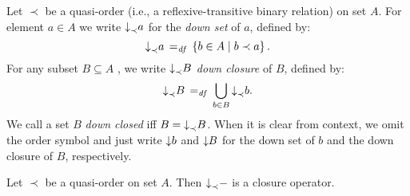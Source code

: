 \documentclass[11pt]{report}
\begin{document}
Let $\prec$ be a quasi-order (i.e., a reflexive-transitive binary
relation) on set $A$. For element $a \in A$ we write
$\operatorname{\downarrow}_{\prec}\!a$ for the \emph{down set} of $a$, defined by: \[
\operatorname{\downarrow}_{\prec}\!a \operatorname{\;=_{\mathit{df}}\;} \left\lbrace b \in A \mid b \prec a \right\rbrace.\] For any subset $B
\subseteq A$ , we write $\operatorname{\downarrow}_{\prec}\!B$ \emph{down closure} of $B$,
defined by: \[ \operatorname{\downarrow}_{\prec}\!B \operatorname{\;=_{\mathit{df}}\;} \bigcup_{b \in B}
\operatorname{\downarrow}_{\prec}\!b.\] We call a set $B$ \emph{down closed} iff $B =
\operatorname{\downarrow}_{\prec}\!B$. When it is clear from context, we omit the order
symbol and just write $\operatorname{\downarrow}\!b$ and $\operatorname{\downarrow}\!B$ for the down set of
$b$ and the down closure of $B$, respectively.

\begin{lemma}
  \label{lem:down-closure}
  Let $\prec$ be a quasi-order on set $A$. Then $\operatorname{\downarrow}_{\prec}\!-$ is
  a closure operator.
\end{lemma}
\end{document}
